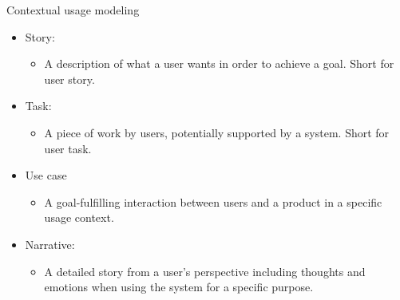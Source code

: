 \begin{Slide}{Contextual usage modeling}

\begin{itemize}
\item Story:
\begin{itemize}
\item A description of what a user wants in order to achieve a goal. Short for user story.
\end{itemize}
\item Task: 
\begin{itemize}
\item A piece of work by users, potentially supported by a system. Short for user task.
\end{itemize}
\item Use case
\begin{itemize}
\item A goal-fulfilling interaction between users and a product in a specific usage context.
\end{itemize}
\item Narrative:
\begin{itemize}
\item A detailed story from a user's perspective including thoughts and emotions when using the system for a specific purpose.

\end{itemize}
\end{itemize}
\end{Slide}